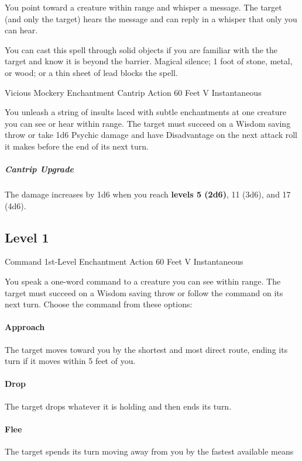 \documentclass[letterpaper,openany,oneside,twocolumn]{book}
\begin{document}
You point toward a creature within range and whisper a message. The target (and only the target) hears the message and can reply in a whisper that only you can hear.

You can cast this spell through solid objects if you are familiar with the the target and know it is beyond the barrier. Magical silence; 1 foot of stone, metal, or wood; or a thin sheet of lead blocks the spell.

\DndSpellHeader
  {Vicious Mockery}
  {Enchantment Cantrip}
  {Action}
  {60 Feet}
  {V}
  {Instantaneous}

You unleash a string of insults laced with subtle enchantments at one creature you can see or hear within range. The target must succeed on a Wisdom saving throw or take 1d6 Psychic damage and have Disadvantage on the next attack roll it makes before the end of its next turn.

\subparagraph*{Cantrip Upgrade} The damage increases by 1d6 when you reach \textbf{levels 5 (2d6)}, 11 (3d6), and 17 (4d6).

\subsection*{Level 1}

\DndSpellHeader
  {Command}
  {1st-Level Enchantment}
  {Action}
  {60 Feet}
  {V}
  {Instantaneous}

You speak a one-word command to a creature you can see within range. The target must succeed on a Wisdom saving throw or follow the command on its next turn. Choose the command from these options:

\paragraph*{Approach} The target moves toward you by the shortest and most direct route, ending its turn if it moves within 5 feet of you.

\paragraph*{Drop} The target drops whatever it is holding and then ends its turn.

\paragraph*{Flee} The target spends its turn moving away from you by the fastest available means
\end{document}
